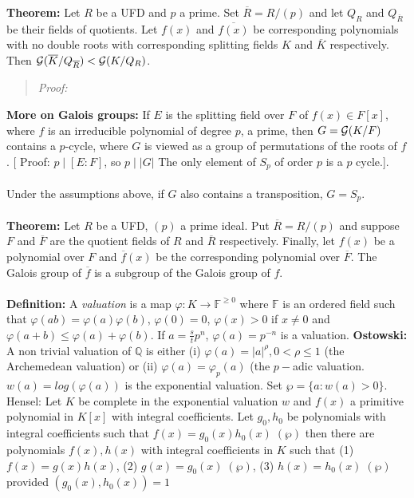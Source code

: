 {\bf Theorem:} Let $R$ be a UFD and $p$ a prime.  Set 
${\overline R}= R/(p)$ and let $Q_R$ and $Q_{\overline R}$ be their fields of
quotients.  Let $f(x)$ and ${\overline {f(x)}}$ be corresponding polynomials
with no double roots with corresponding splitting fields $K$ and ${\overline K}$
respectively.  Then 
${\cal G}({\overline K}/Q_{\overline R})< {\cal G}(K/Q_R)$.
\begin{quote}
\emph{Proof:}
\end{quote}
{\bf More on Galois groups:} If $E$ is the splitting field over $F$ of $f(x) \in F[x]$, where
$f$ is an irreducible polynomial of degree $p$, a prime, then $G={\cal G}(K/F)$ contains a $p$-cycle,
where $G$ is viewed as a group of permutations of the roots of $f$.
[ Proof:  $p \mid [E:F]$, so $p \mid |G|$  The only element of $S_p$ of order $p$
is a $p$ cycle.].
\\
\\
Under the assumptions above, if $G$ also contains a transposition, $G=S_p$.
\\
\\
{\bf Theorem:} Let $R$ be a UFD, $(p)$ a prime ideal.  Put ${\overline R} = R/(p)$ and suppose
$F$ and ${\overline F}$ are the quotient fields of $R$ and ${\overline R}$ respectively.
Finally, let $f(x)$ be a polynomial over $F$ and ${\overline f}(x)$ be the corresponding
polynomial over ${\overline F}$.  The Galois group of ${\overline f}$ is a subgroup of the
Galois group of $f$.
\\
\\
{\bf Definition:}
A \emph{valuation} is a map $\varphi: K \rightarrow {\mathbb F}^{\ge 0}$ 
where ${\mathbb F}$ is an
ordered field such that $\varphi(ab)= 
\varphi(a) \varphi(b)$, $\varphi(0)=0$, $\varphi(x)>0$ if $x \ne 0$ and 
$\varphi(a+b) \le
\varphi(a) + \varphi(b)$.  If $a= {\frac s t} p^n$, $\varphi(a)= p^{-n}$ is a valuation.
{\bf Ostowski:} A non trivial valuation of ${\mathbb Q}$ is either 
(i) $\varphi(a)= |a|^\rho, 0 < \rho \le 1$ (the Archemedean valuation) or (ii)
$\varphi(a)= \varphi_p(a)$ (the $p-$adic valuation.  $w(a)= log(\varphi(a))$ is the 
exponential valuation.  Set $\wp= \{a: w(a) >0 \}$.  Hensel:  Let $K$ be complete
in the exponential valuation $w$ and $f(x)$ a primitive polynomial in $K[x]$ with integral
coefficients. Let $g_0 , h_0$ be polynomials with integral coefficients such that
$f(x)= g_0(x) h_0(x) \; (\wp)$ then there are polynomials $f(x), h(x)$ with integral
coefficients in $K$ such that (1) $f(x)=g(x)h(x)$, 
(2) $g(x)= g_0(x) \; (\wp)$,
(3) $h(x)= h_0(x) \; (\wp)$ provided $(g_0(x), h_0(x))=1$ 
